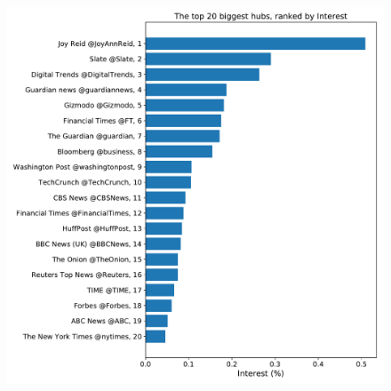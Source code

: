 \documentclass[12pt, twoside]{report}
\begin{document}
    \begin{figure}[htbp]
      \centering
      \includegraphics[width=\textwidth]{../../scripts/network_analysis/imgs/hubs_interest.pdf}            
      \caption{}
    \end{figure}
    
\end{document}
